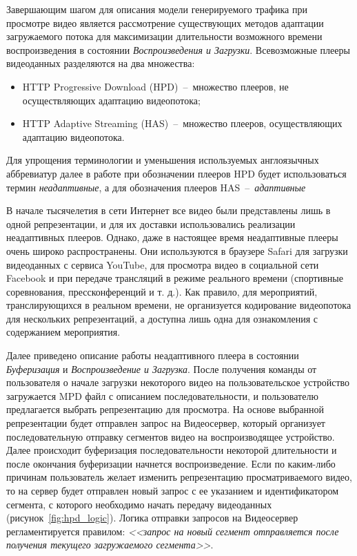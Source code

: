Завершающим шагом для описания модели генерируемого трафика при просмотре видео является рассмотрение существующих методов адаптации загружаемого потока для максимизации длительности возможного времени воспроизведения в состоянии \textit{Воспроизведения и Загрузки}. Всевозможные плееры видеоданных разделяются на два множества:
\begin{itemize}
  \item HTTP Progressive Download (HPD)~--~множество плееров, не осуществляющих адаптацию видеопотока;
  \item HTTP Adaptive Streaming (HAS)~--~множество плееров, осуществляющих адаптацию видеопотока.
\end{itemize}
Для упрощения терминологии и уменьшения используемых англоязычных аббревиатур далее в работе при обозначении плееров HPD будет использоваться термин \textit{неадаптивные}, а для обозначения плееров HAS~--~\textit{адаптивные}

В начале тысячелетия в сети Интернет все видео были представлены лишь в одной репрезентации, и для их доставки использовались реализации неадаптивных плееров. Однако, даже в настоящее время неадаптивные плееры очень широко распространены. Они используются в браузере Safari для загрузки видеоданных с сервиса YouTube, для просмотра видео в социальной сети Facebook и при передаче трансляций в режиме реального времени (спортивные соревнования, прессконференций и т. д.). Как правило, для мероприятий, транслирующихся в реальном времени, не организуется кодирование видеопотока для нескольких репрезентаций, а доступна лишь одна для ознакомления с содержанием мероприятия.

Далее приведено описание работы неадаптивного плеера в состоянии \textit{Буферизация} и \textit{Воспроизведение и Загрузка}. После получения команды от пользователя о начале загрузки некоторого видео на пользовательское устройство загружается MPD файл с описанием последовательности, и пользователю предлагается выбрать репрезентацию для просмотра. На основе выбранной репрезентации будет отправлен запрос на Видеосервер, который организует последовательную отправку сегментов видео на воспроизводящее устройство. Далее происходит буферизация последовательности некоторой длительности и после окончания буферизации начнется воспроизведение. Если по каким-либо причинам пользователь желает изменить репрезентацию просматриваемого видео, то на сервер будет отправлен новый запрос с ее указанием и идентификатором сегмента, с которого необходимо начать передачу видеоданных (рисунок~\ref{fig:hpd_logic}). Логика отправки запросов на Видеосервер регламентируется правилом: \textit{<<запрос на новый сегмент отправляется после получения текущего загружаемого сегмента>>}.

